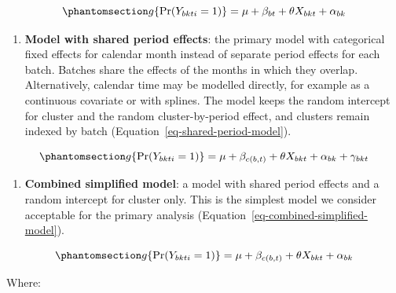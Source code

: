 \documentclass[
]{scrartcl}
\providecommand{\tightlist}{%
  \setlength{\itemsep}{0pt}\setlength{\parskip}{0pt}}\usepackage{longtable,booktabs,array}
\begin{document}
\begin{equation}\phantomsection\label{eq-simplified-random-effects-model}{
g\{\Pr(Y_{bkti} = 1)\} = \mu + \beta_{bt} + \theta X_{bkt} + \alpha_{bk}
}\end{equation}

\begin{enumerate}
\def\labelenumi{\arabic{enumi}.}
\setcounter{enumi}{2}
\tightlist
\item
  \textbf{Model with shared period effects}: the primary model with
  categorical fixed effects for calendar month instead of separate
  period effects for each batch. Batches share the effects of the months
  in which they overlap. Alternatively, calendar time may be modelled
  directly, for example as a continuous covariate or with splines. The
  model keeps the random intercept for cluster and the random
  cluster-by-period effect, and clusters remain indexed by batch
  (Equation~\ref{eq-shared-period-model}).
\end{enumerate}

\begin{equation}\phantomsection\label{eq-shared-period-model}{
g\{\Pr(Y_{bkti} = 1)\}
= \mu + \beta_{c(b,t)} + \theta X_{bkt} + \alpha_{bk} + \gamma_{bkt}
}\end{equation}

\begin{enumerate}
\def\labelenumi{\arabic{enumi}.}
\setcounter{enumi}{3}
\tightlist
\item
  \textbf{Combined simplified model}: a model with shared period effects
  and a random intercept for cluster only. This is the simplest model we
  consider acceptable for the primary analysis
  (Equation~\ref{eq-combined-simplified-model}).
\end{enumerate}

\begin{equation}\phantomsection\label{eq-combined-simplified-model}{
g\{\Pr(Y_{bkti} = 1)\}
= \mu + \beta_{c(b,t)} + \theta X_{bkt} + \alpha_{bk}
}\end{equation}

Where:
\end{document}
